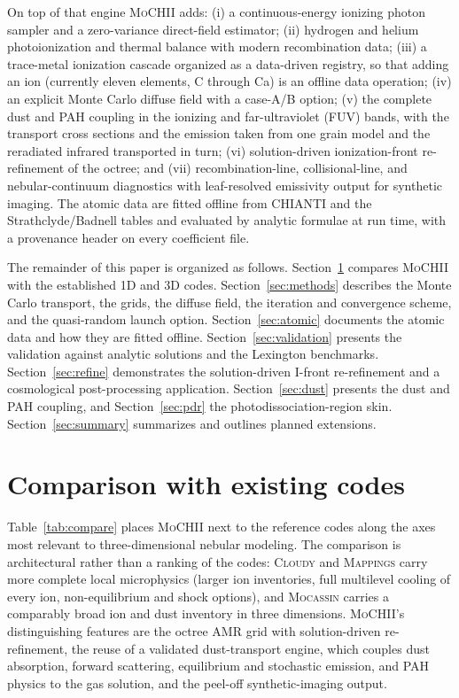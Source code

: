 \documentclass[twocolumn,linenumbers]{aastex702}
\newcommand{\MoCHII}{\textsc{MoCHII}}
\begin{document}
On top of that engine \MoCHII{} adds: (i) a continuous-energy ionizing
photon sampler and a zero-variance direct-field estimator;
(ii) hydrogen and helium photoionization and thermal balance with modern
recombination data; (iii) a trace-metal ionization cascade organized as a
data-driven registry, so that adding an ion (currently eleven elements,
C through Ca) is an offline data operation; (iv) an explicit Monte Carlo
diffuse field with a case-A/B option; (v) the complete dust and PAH
coupling in the ionizing and far-ultraviolet (FUV) bands, with the
transport cross sections and the emission taken from one grain model and
the reradiated infrared transported in turn; (vi) solution-driven
ionization-front re-refinement of the octree; and (vii) recombination-line,
collisional-line, and nebular-continuum diagnostics with leaf-resolved
emissivity output for synthetic imaging.  The atomic data are fitted
offline from CHIANTI and the Strathclyde/Badnell tables and evaluated by
analytic formulae at run time, with a provenance header on every
coefficient file.

The remainder of this paper is organized as follows.
Section~\ref{sec:compare} compares \MoCHII{} with the established 1D and
3D codes.  Section~\ref{sec:methods} describes the Monte Carlo transport,
the grids, the diffuse field, the iteration and convergence scheme, and
the quasi-random launch option.  Section~\ref{sec:atomic} documents the
atomic data and how they are fitted offline.
Section~\ref{sec:validation} presents the validation against analytic
solutions and the Lexington benchmarks.
Section~\ref{sec:refine} demonstrates the solution-driven I-front
re-refinement and a cosmological post-processing application.
Section~\ref{sec:dust} presents the dust and PAH coupling, and
Section~\ref{sec:pdr} the photodissociation-region skin.
Section~\ref{sec:summary} summarizes and outlines planned extensions.

\section{Comparison with existing codes}
\label{sec:compare}

Table~\ref{tab:compare} places \MoCHII{} next to the reference codes along
the axes most relevant to three-dimensional nebular modeling.  The
comparison is architectural rather than a ranking of the codes:
\textsc{Cloudy} and \textsc{Mappings} carry more complete local
microphysics (larger ion inventories, full multilevel cooling of every ion,
non-equilibrium and shock options), and \textsc{Mocassin} carries a
comparably broad ion and dust inventory in three dimensions.  \MoCHII{}'s
distinguishing features are the octree AMR grid with solution-driven
re-refinement, the reuse of a validated dust-transport engine, which couples
dust absorption, forward scattering, equilibrium and stochastic emission,
and PAH physics to the gas solution, and the
peel-off synthetic-imaging output.
\end{document}
